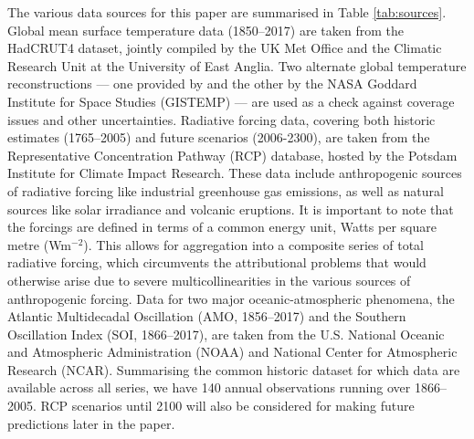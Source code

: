 \documentclass[smallextended]{svjour3}       %
\begin{document}
The various data sources for this paper are summarised in Table
\ref{tab:sources}. Global mean surface temperature data (1850--2017) are
taken from the HadCRUT4 dataset, jointly compiled by the UK Met Office
and the Climatic Research Unit at the University of East Anglia. Two
alternate global temperature reconstructions --- one provided by
\cite{cowtan2014coverage} and the other by the NASA Goddard Institute
for Space Studies (GISTEMP) --- are used as a check against coverage
issues and other uncertainties. Radiative forcing data, covering both
historic estimates (1765--2005) and future scenarios (2006-2300), are
taken from the Representative Concentration Pathway (RCP) database,
hosted by the Potsdam Institute for Climate Impact Research. These data
include anthropogenic sources of radiative forcing like industrial
greenhouse gas emissions, as well as natural sources like solar
irradiance and volcanic eruptions. It is important to note that the
forcings are defined in terms of a common energy unit, Watts per square
metre (Wm\(^{-2}\)). This allows for aggregation into a composite series
of total radiative forcing, which circumvents the attributional problems
that would otherwise arise due to severe multicollinearities in the
various sources of anthropogenic forcing. Data for two major
oceanic-atmospheric phenomena, the Atlantic Multidecadal Oscillation
(AMO, 1856--2017) and the Southern Oscillation Index (SOI, 1866--2017),
are taken from the U.S. National Oceanic and Atmospheric Administration
(NOAA) and National Center for Atmospheric Research (NCAR). Summarising
the common historic dataset for which data are available across all
series, we have 140 annual observations running over 1866--2005. RCP
scenarios until 2100 will also be considered for making future
predictions later in the paper.
\end{document}
